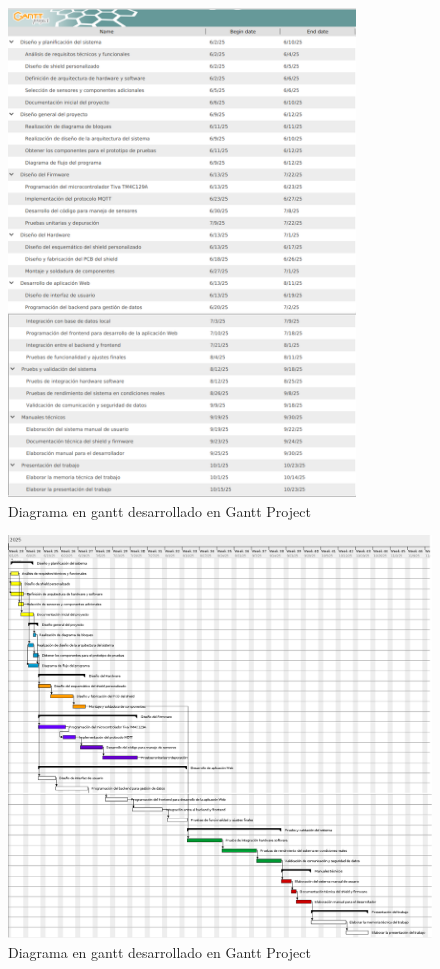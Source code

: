 \documentclass[
11pt, %
]{charter}
\begin{document}
\begin{figure}[htpb]
	\centering 
	\includegraphics[width=0.82\textwidth]{./Figuras/gantt_1.png}
	\caption{Diagrama en gantt desarrollado en Gantt Project}
	\label{fig:Gannt1}
\end{figure}


\begin{landscape}
\begin{figure}[htpb]
\centering 
\includegraphics[height=1\textheight]{./Figuras/gantt2.png}
\caption{Diagrama en gantt desarrollado en Gantt Project} 
\label{fig:Gantt2}
\end{figure}

\end{landscape}
\end{document}
